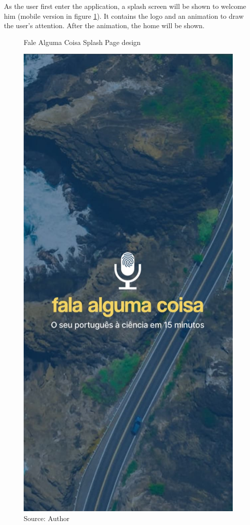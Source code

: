 As the user first enter the application, a splash screen will be shown to welcome him (mobile version in figure \ref{fig:falealgumacoisa-splash-page-design}). It contains the logo and an animation to draw the user's attention. After the animation, the home will be shown.

\begin{figure}[ht]
    \centering
    \caption{Fale Alguma Coisa Splash Page design}
    \includegraphics[width=\linewidth/2]{images/app/m-splash.jpg}
    \caption*{Source: Author}
    \label{fig:falealgumacoisa-splash-page-design}
\end{figure}

